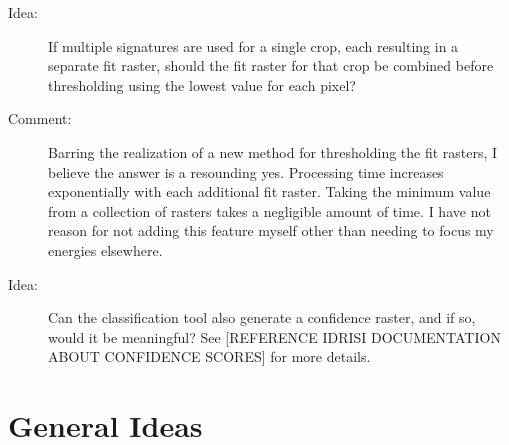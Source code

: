 \begin{description}
\item[Idea:] If multiple signatures are used for a single crop, each resulting in a separate fit raster, should the fit raster for that crop be combined before thresholding using the lowest value for each pixel?

\item[Comment:] Barring the realization of a new method for thresholding the fit rasters, I believe the answer is a resounding yes. Processing time increases exponentially with each additional fit raster. Taking the minimum value from a collection of rasters takes a negligible amount of time. I have not reason for not adding this feature myself other than needing to focus my energies elsewhere.

\item[Idea:] Can the classification tool also generate a confidence raster, and if so, would it be meaningful? See [REFERENCE IDRISI DOCUMENTATION ABOUT CONFIDENCE SCORES] for more details.
\end{description}

\section{General Ideas}

